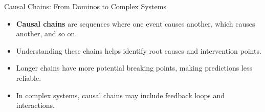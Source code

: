 \documentclass{beamer}
\begin{document}
\begin{frame}{Causal Chains: From Dominos to Complex Systems}
    \begin{itemize}
        \item \textbf{Causal chains} are sequences where one event causes another, which causes another, and so on.
        \item Understanding these chains helps identify root causes and intervention points.
        \item Longer chains have more potential breaking points, making predictions less reliable.
        \item In complex systems, causal chains may include feedback loops and interactions.
    \end{itemize}
    
    \begin{center}
    \end{center}
\end{frame}
\end{document}

